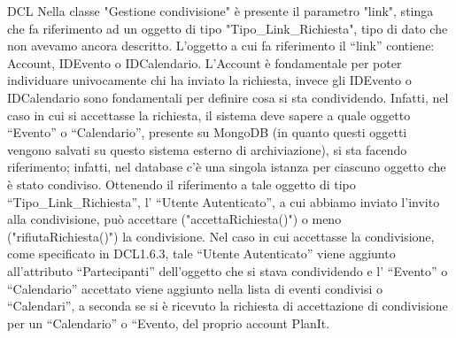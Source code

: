 \begin{listaPersonale}{DCL}
    Nella classe "Gestione condivisione" è presente il parametro "link", stinga che fa riferimento ad un oggetto di tipo "Tipo\_Link\_Richiesta", tipo di dato che non avevamo ancora descritto.
    L’oggetto a cui fa riferimento il “link” contiene: Account, IDEvento o IDCalendario. L’Account è fondamentale per poter individuare univocamente chi ha inviato la richiesta, invece gli IDEvento o IDCalendario sono fondamentali per definire cosa si sta condividendo. Infatti, nel caso in cui si accettasse la richiesta, il sistema deve sapere a quale oggetto “Evento” o “Calendario”, presente su MongoDB (in quanto questi oggetti vengono salvati su questo sistema esterno di archiviazione), si sta facendo riferimento; infatti, nel database c’è una singola istanza per ciascuno oggetto che è stato condiviso.
    Ottenendo il riferimento a tale oggetto di tipo “Tipo\_Link\_Richiesta”, l’ “Utente Autenticato”, a cui abbiamo inviato l’invito alla condivisione, può accettare ("accettaRichiesta()") o meno ("rifiutaRichiesta()") la condivisione. Nel caso in cui accettasse la condivisione, come specificato in DCL1.6.3, tale “Utente Autenticato” viene aggiunto all’attributo “Partecipanti” dell’oggetto che si stava condividendo e l’ “Evento” o “Calendario” accettato viene aggiunto nella lista di eventi condivisi o “Calendari”, a seconda se si è ricevuto la richiesta di accettazione di condivisione per un “Calendario” o “Evento, del proprio account PlanIt.


\end{listaPersonale}